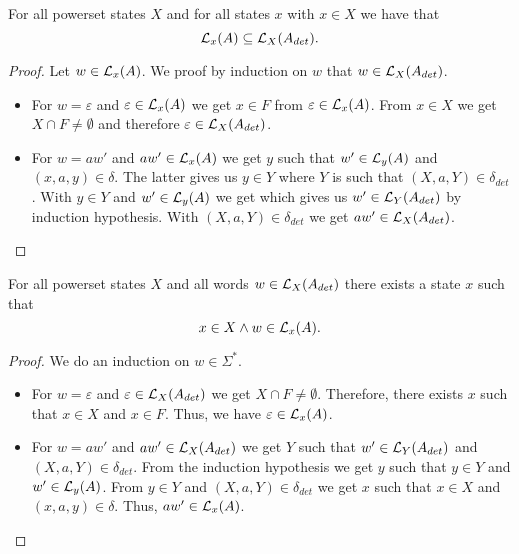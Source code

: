 
\begin{lemma}
    \label{nfa_to_dfa_complete}
    For all powerset states $X$ and for all states $x$ with $x \in X$ we have that
    \begin{equation*}
        \mathcal{L}_{x}(A) \subseteq \mathcal{L}_{X}(A_{det}).
    \end{equation*}
\end{lemma}

\begin{proof}
    Let $w \in \mathcal{L}_{x}(A)$. We proof by induction on $w$ that $w \in \mathcal{L}_{X}(A_{det})$. 
    \begin{itemize}
        \item
            For $w = \varepsilon$ and $\varepsilon \in \mathcal{L}_{x}(A)$ we get $x \in F$ from $\varepsilon \in \mathcal{L}_{x}(A)$. 
            From $x \in X$ we get $X \cap F \neq \emptyset$ and therefore $\varepsilon \in \mathcal{L}_{X}(A_{det})$.
        \item
            For $w = a w'$ and $a w' \in \mathcal{L}_{x}(A)$ we get $y$ such that $w' \in \mathcal{L}_{y}(A)$ and $(x,a,y) \in \delta$.
            The latter gives us $y \in Y$ where $Y$ is such that $(X, a, Y) \in \delta_{det}$.
            With $y \in Y$ and $w' \in \mathcal{L}_{y}(A)$ we get 
            which gives us $w' \in \mathcal{L}_{Y}(A_{det})$ by induction hypothesis.
            With $(X, a, Y) \in \delta_{det}$ we get $a w' \in \mathcal{L}_{X}(A_{det})$.
    \end{itemize}
\end{proof}


\begin{lemma}
    \label{nfa_to_dfa_sound}
    For all powerset states $X$ and all words $w \in \mathcal{L}_{X}(A_{det})$ there exists a state $x$ such that 
    \begin{equation*}
        x \in X \wedge
        w \in \mathcal{L}_{x}(A).
    \end{equation*}
\end{lemma}

\begin{proof}
    We do an induction on $w \in \Sigma^*$. %
    \begin{itemize}
        \item
            For $w = \varepsilon$ and $\varepsilon \in \mathcal{L}_{X}(A_{det})$ we get  $X \cap F \neq \emptyset$.
            Therefore, there exists $x$ such that $x \in X$ and $x \in F$.
            Thus, we have $\varepsilon \in \mathcal{L}_{x}(A)$.
        \item
            For $w = a w'$ and $a w' \in \mathcal{L}_{X}(A_{det})$ we get $Y$ such that $w' \in \mathcal{L}_{Y}(A_{det})$ and $(X,a,Y) \in \delta_{det}$.
            From the induction hypothesis we get $y$ such that $y \in Y$ and $w' \in \mathcal{L}_{y}(A)$.
            From $y \in Y$ and $(X, a, Y) \in \delta_{det}$ we get $x$ such that $x \in X$ and $(x, a, y) \in \delta$.
            Thus, $a w' \in \mathcal{L}_{x}(A)$.
    \end{itemize}
\end{proof}

